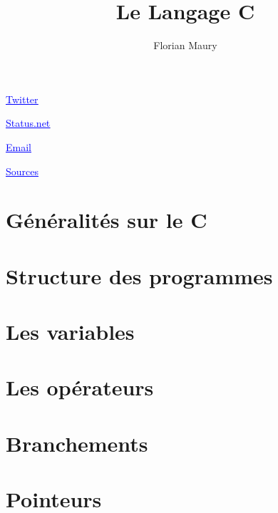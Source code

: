 \documentclass[handout]{beamer}
\title{Le Langage C}
\author{Florian Maury}
\institute{3IL}
\begin{document}
\begin{frame}
  \titlepage
  \vspace{0.5cm}
  \par
  {\footnotesize\begin{center}
    \par
    \href{http://www.twitter.com/X\_Cli}{\textcolor{blue}{\underline{Twitter}}}
    \vspace{0.2cm}
    \par
    \href{http://www.identi.ca/ixtli}{\textcolor{blue}{\underline{Status.net}}}
    \vspace{0.2cm}
    \par
    \href{mailto:coursc@x-cli.com}{\textcolor{blue}{\underline{Email}}}
    \vspace{0.2cm}
    \par
    \href{svn://c.svn.x-cli.com/ccourse}{\textcolor{blue}{\underline{Sources}}}
  \end{center}}
\end{frame}

\begin{frame}
 \tableofcontents
\end{frame}

\section{G\'en\'eralit\'es sur le C}



\section{Structure des programmes}



\section{Les variables}



\section{Les opérateurs}



\section{Branchements}



\section{Pointeurs}


\end{document}
